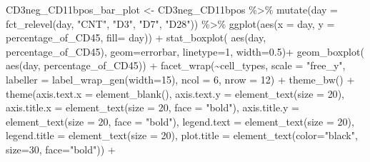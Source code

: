 \documentclass[
]{book}
\newenvironment{Shaded}{\begin{snugshade}}{\end{snugshade}}
\newcommand{\AttributeTok}[1]{\textcolor[rgb]{0.77,0.63,0.00}{#1}}
\newcommand{\DecValTok}[1]{\textcolor[rgb]{0.00,0.00,0.81}{#1}}
\newcommand{\FloatTok}[1]{\textcolor[rgb]{0.00,0.00,0.81}{#1}}
\newcommand{\FunctionTok}[1]{\textcolor[rgb]{0.00,0.00,0.00}{#1}}
\newcommand{\NormalTok}[1]{#1}
\newcommand{\OtherTok}[1]{\textcolor[rgb]{0.56,0.35,0.01}{#1}}
\newcommand{\SpecialCharTok}[1]{\textcolor[rgb]{0.00,0.00,0.00}{#1}}
\newcommand{\StringTok}[1]{\textcolor[rgb]{0.31,0.60,0.02}{#1}}
\begin{document}
\begin{Shaded}
\begin{Highlighting}[]
\NormalTok{CD3neg\_CD11bpos\_bar\_plot }\OtherTok{\textless{}{-}}\NormalTok{ CD3neg\_CD11bpos }\SpecialCharTok{\%\textgreater{}\%}
\FunctionTok{mutate}\NormalTok{(}\AttributeTok{day =} \FunctionTok{fct\_relevel}\NormalTok{(day, }
            \StringTok{"CNT"}\NormalTok{, }\StringTok{"D3"}\NormalTok{, }\StringTok{"D7"}\NormalTok{, }
            \StringTok{"D28"}\NormalTok{)) }\SpecialCharTok{\%\textgreater{}\%}
  \FunctionTok{ggplot}\NormalTok{(}\FunctionTok{aes}\NormalTok{(}\AttributeTok{x =}\NormalTok{ day, }\AttributeTok{y =}\NormalTok{ percentage\_of\_CD45, }\AttributeTok{fill=}\NormalTok{ day)) }\SpecialCharTok{+}
  \FunctionTok{stat\_boxplot}\NormalTok{( }\FunctionTok{aes}\NormalTok{(day, percentage\_of\_CD45), }
    \AttributeTok{geom=}\StringTok{\textquotesingle{}errorbar\textquotesingle{}}\NormalTok{, }\AttributeTok{linetype=}\DecValTok{1}\NormalTok{, }\AttributeTok{width=}\FloatTok{0.5}\NormalTok{)}\SpecialCharTok{+}  
  \FunctionTok{geom\_boxplot}\NormalTok{( }\FunctionTok{aes}\NormalTok{(day, percentage\_of\_CD45)) }\SpecialCharTok{+} 
  \FunctionTok{facet\_wrap}\NormalTok{(}\SpecialCharTok{\textasciitilde{}}\NormalTok{cell\_types, }\AttributeTok{scale =} \StringTok{"free\_y"}\NormalTok{, }\AttributeTok{labeller =} \FunctionTok{label\_wrap\_gen}\NormalTok{(}\AttributeTok{width=}\DecValTok{15}\NormalTok{), }\AttributeTok{ncol =} \DecValTok{6}\NormalTok{, }\AttributeTok{nrow =} \DecValTok{12}\NormalTok{) }\SpecialCharTok{+} 
  \FunctionTok{theme\_bw}\NormalTok{() }\SpecialCharTok{+} 
  \FunctionTok{theme}\NormalTok{(}\AttributeTok{axis.text.x =} \FunctionTok{element\_blank}\NormalTok{(), }\AttributeTok{axis.text.y =} \FunctionTok{element\_text}\NormalTok{(}\AttributeTok{size =} \DecValTok{20}\NormalTok{), }
        \AttributeTok{axis.title.x =} \FunctionTok{element\_text}\NormalTok{(}\AttributeTok{size =} \DecValTok{20}\NormalTok{, }\AttributeTok{face =} \StringTok{"bold"}\NormalTok{), }
        \AttributeTok{axis.title.y =} \FunctionTok{element\_text}\NormalTok{(}\AttributeTok{size =} \DecValTok{20}\NormalTok{, }\AttributeTok{face =} \StringTok{"bold"}\NormalTok{), }
        \AttributeTok{legend.text =} \FunctionTok{element\_text}\NormalTok{(}\AttributeTok{size =} \DecValTok{20}\NormalTok{), }
        \AttributeTok{legend.title =} \FunctionTok{element\_text}\NormalTok{(}\AttributeTok{size =} \DecValTok{20}\NormalTok{), }
        \AttributeTok{plot.title =} \FunctionTok{element\_text}\NormalTok{(}\AttributeTok{color=}\StringTok{"black"}\NormalTok{, }\AttributeTok{size=}\DecValTok{30}\NormalTok{, }\AttributeTok{face=}\StringTok{"bold"}\NormalTok{)) }\SpecialCharTok{+} 

\end{Highlighting}
\end{Shaded}
\end{document}
